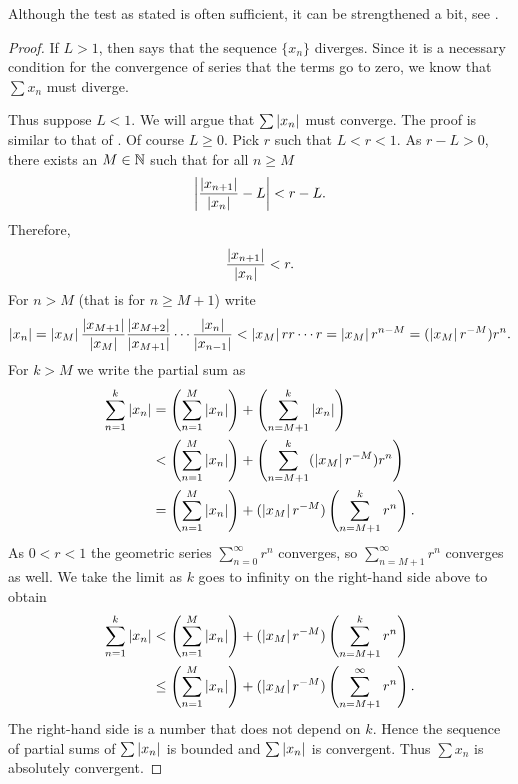 Although the test as stated is often sufficient, it can be strengthened a
bit, see .

\begin{proof}
If $L > 1$, then
 says that the sequence $\{ x_n \}$
diverges.  Since it is a necessary condition for the convergence of series
that the terms go to zero, we know that $\sum x_n$ must diverge.

Thus suppose $L < 1$.
We will argue that $\sum \left\lvert {x_n} \right\rvert$ must converge.
The proof is similar to that of .  Of course $L \geq
0$.  
Pick
$r$ such that $L < r < 1$.  As $r-L > 0$, there exists an $M \in {\mathbb{N}}$ such that for
all $n \geq M$
\begin{equation*}
\left\lvert {\frac{\left\lvert {x_{n+1}} \right\rvert}{\left\lvert {x_n} \right\rvert} - L} \right\rvert < r-L .
\end{equation*}
Therefore,
\begin{equation*}
\frac{\left\lvert {x_{n+1}} \right\rvert}{\left\lvert {x_n} \right\rvert} < r .
\end{equation*}
For $n > M$ (that is for $n \geq M+1$)
write
\begin{equation*}
\left\lvert {x_n} \right\rvert =
\left\lvert {x_M} \right\rvert
\frac{\left\lvert {x_{M+1}} \right\rvert}{\left\lvert {x_{M}} \right\rvert}
\frac{\left\lvert {x_{M+2}} \right\rvert}{\left\lvert {x_{M+1}} \right\rvert}
\cdots
\frac{\left\lvert {x_{n}} \right\rvert}{\left\lvert {x_{n-1}} \right\rvert}
<
\left\lvert {x_M} \right\rvert
r r \cdots r = \left\lvert {x_M} \right\rvert r^{n-M} = (\left\lvert {x_M} \right\rvert r^{-M}) r^n .
\end{equation*}
For $k > M$ we write the partial sum as
\begin{equation*}
\begin{split}
\sum_{n=1}^k \left\lvert {x_n} \right\rvert
& =
\left(\sum_{n=1}^{M} \left\lvert {x_n} \right\rvert \right)
+
\left(\sum_{n=M+1}^{k} \left\lvert {x_n} \right\rvert \right)
\\
& <
\left(\sum_{n=1}^{M} \left\lvert {x_n} \right\rvert \right)
+
\left(\sum_{n=M+1}^{k} 
(\left\lvert {x_M} \right\rvert r^{-M}) r^n
\right)
\\
& =
\left(\sum_{n=1}^{M} \left\lvert {x_n} \right\rvert \right)
+
(\left\lvert {x_M} \right\rvert r^{-M})
\left( \sum_{n=M+1}^{k} r^n \right) .
\end{split}
\end{equation*}
As $0 < r < 1$ the geometric series
$\sum_{n=0}^{\infty} r^n$ converges, so
$\sum_{n=M+1}^{\infty} r^n$ converges as well.  We take the
limit as $k$ goes to infinity on the right-hand side above to obtain
\begin{equation*}
\begin{split}
\sum_{n=1}^k \left\lvert {x_n} \right\rvert
& <
\left(\sum_{n=1}^{M} \left\lvert {x_n} \right\rvert \right)
+
(\left\lvert {x_M} \right\rvert r^{-M})
\left( \sum_{n=M+1}^{k} r^n \right) 
\\
& \leq
\left(\sum_{n=1}^{M} \left\lvert {x_n} \right\rvert \right)
+
(\left\lvert {x_M} \right\rvert r^{-M})
\left( \sum_{n=M+1}^{\infty} r^n \right) .
\end{split}
\end{equation*}
The right-hand side is a number that does not depend on $k$.
Hence the sequence of partial sums of $\sum \left\lvert {x_n} \right\rvert$ is bounded
and $\sum \left\lvert {x_n} \right\rvert$ is convergent.  Thus $\sum x_n$ is
absolutely convergent.
\end{proof}

